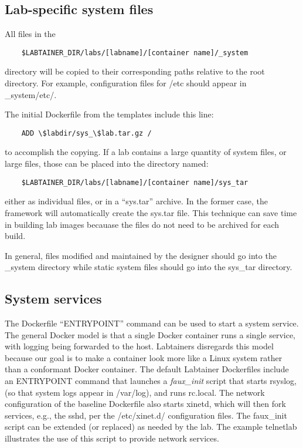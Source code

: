 \documentclass[12pt]{article}
\begin{document}
\subsection{Lab-specific system files}
All files in the
\begin{verbatim}
    $LABTAINER_DIR/labs/[labname]/[container name]/_system
\end{verbatim}
directory will be copied to their corresponding paths relative to the root directory.
For example, configuration files for /etc should appear in \_system/etc/.

The initial Dockerfile from the templates include this line:
\begin{verbatim}
    ADD \$labdir/sys_\$lab.tar.gz /
\end{verbatim}
\noindent to accomplish the copying. 
If a lab contains a large quantity of system files, or large files, those
can be placed into the directory named:
\begin{verbatim}
    $LABTAINER_DIR/labs/[labname]/[container name]/sys_tar
\end{verbatim}
either as individual files, or in a ``sys.tar'' archive.  In the former case,
the framework will automatically create the sys.tar file.  This technique 
can save time in building lab images becauase the files do not need to be 
archived for each build.  

In general, files modified and maintained by the designer should go into the
\_system directory while static system files should go into the sys\_tar directory.

\subsection {System services}
The Dockerfile ``ENTRYPOINT'' command can be used to start a system service.  The general Docker 
model is that a single Docker container runs a single service, with logging being forwarded to 
the host.  Labtainers disregards this model because our goal is to make a container look more like a Linux
system rather than a conformant Docker container.  The default Labtainer Dockerfiles include an
ENTRYPOINT command that launches a \textit{faux\_init} script that starts rsyslog, (so that system logs
appear in /var/log), and runs rc.local.  The network configuration of the baseline Dockerfile also starts xinetd,
which will then fork services, e.g., the sshd, per the /etc/xinet.d/ configuration files.  The faux\_init script
can be extended (or replaced) as needed by the lab.  The example telnetlab illustrates the use of this script
to provide network services.
\end{document}

